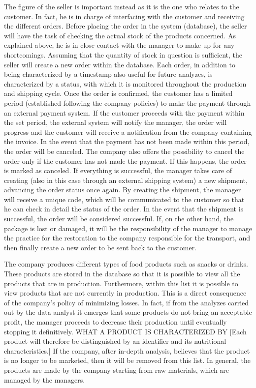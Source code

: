 The figure of the seller is important instead as it is the one who relates to the customer. In fact, he is in charge of interfacing with the customer and receiving the different orders. Before placing the order in the system (database), the seller will have the task of checking the actual stock of the products concerned. As explained above, he is in close contact with the manager to make up for any shortcomings. Assuming that the quantity of stock in question is sufficient, the seller will create a new order within the database. Each order, in addition to being characterized by a timestamp also useful for future analyzes, is characterized by a status, with which it is monitored throughout the production and shipping cycle. Once the order is confirmed, the customer has a limited period (established following the company policies) to make the payment through an external payment system. If the customer proceeds with the payment within the set period, the external system will notify the manager, the order will progress and the customer will receive a notification from the company containing the invoice. In the event that the payment has not been made within this period, the order will be canceled. The company also offers the possibility to cancel the order only if the customer has not made the payment. If this happens, the order is marked as canceled. If everything is successful, the manager takes care of creating (also in this case through an external shipping system) a new shipment, advancing the order status once again. By creating the shipment, the manager will receive a unique code, which will be communicated to the customer so that he can check in detail the status of the order. In the event that the shipment is successful, the order will be considered successful. If, on the other hand, the package is lost or damaged, it will be the responsibility of the manager to manage the practice for the restoration to the company responsible for the transport, and then finally create a new order to be sent back to the customer.

The company produces different types of food products such as snacks or drinks. These products are stored in the database so that it is possible to view all the products that are in production. Furthermore, within this list it is possible to view products that are not currently in production. This is a direct consequence of the company's policy of minimizing losses. In fact, if from the analyzes carried out by the data analyst it emerges that some products do not bring an acceptable profit, the manager proceeds to decrease their production until eventually stopping it definitively. WHAT A PRODUCT IS CHARACTERIZED BY [Each product will therefore be distinguished by an identifier and its nutritional characteristics.] If the company, after in-depth analysis, believes that the product is no longer to be marketed, then it will be removed from this list. In general, the products are made by the company starting from raw materials, which are managed by the managers.

